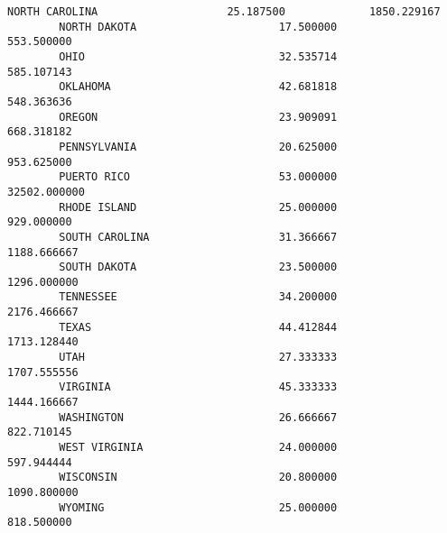 \documentclass[11pt]{article}
\begin{document}
\begin{Verbatim}[commandchars=\\\{\}]
        NORTH CAROLINA                    25.187500             1850.229167   
        NORTH DAKOTA                      17.500000              553.500000   
        OHIO                              32.535714              585.107143   
        OKLAHOMA                          42.681818              548.363636   
        OREGON                            23.909091              668.318182   
        PENNSYLVANIA                      20.625000              953.625000   
        PUERTO RICO                       53.000000            32502.000000   
        RHODE ISLAND                      25.000000              929.000000   
        SOUTH CAROLINA                    31.366667             1188.666667   
        SOUTH DAKOTA                      23.500000             1296.000000   
        TENNESSEE                         34.200000             2176.466667   
        TEXAS                             44.412844             1713.128440   
        UTAH                              27.333333             1707.555556   
        VIRGINIA                          45.333333             1444.166667   
        WASHINGTON                        26.666667              822.710145   
        WEST VIRGINIA                     24.000000              597.944444   
        WISCONSIN                         20.800000             1090.800000   
        WYOMING                           25.000000              818.500000   
        

\end{Verbatim}
\end{document}
